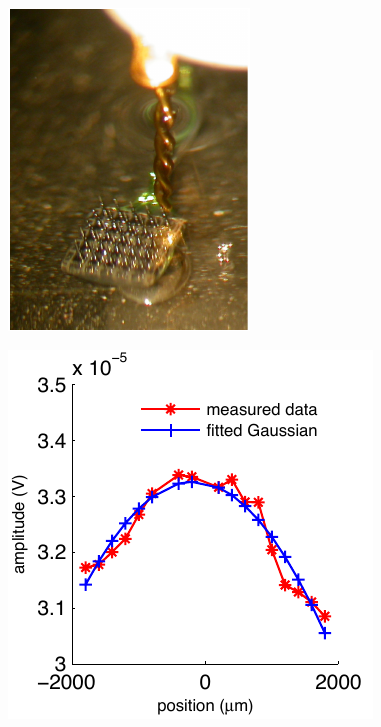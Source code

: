 \documentclass[5p,authoryear]{elsarticle}
\begin{document}
\clearpage
\newpage
\begin{figure}[!ht]
\begin{center}
\includegraphics{./Graph/pdf/fig13.pdf}
\end{center}
\caption{}
\label{fig:SensorAndSource}
\end{figure}
\clearpage
\newpage
\begin{figure}[!ht]
\begin{center}
\includegraphics{./Graph/pdf/fig14.pdf}
\end{center}
\caption{}
\label{fig:Ch3}
\end{figure}
\clearpage
\newpage
\appendix
\end{document}
